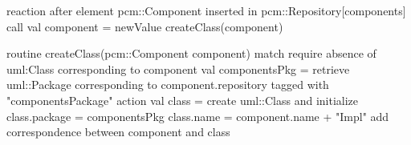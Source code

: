 reaction {
   after element pcm::Component inserted in pcm::Repository[components]
   call {
      val component = newValue
      createClass(component)
   }
}

routine createClass(pcm::Component component) {
   match {
      require absence of uml:Class
         corresponding to component
      val componentsPkg = retrieve uml::Package
         corresponding to component.repository
         tagged with "componentsPackage"
   }
   action {
      val class = create uml::Class and initialize {
         class.package = componentsPkg
         class.name = component.name + "Impl"
      }
      add correspondence between component and class
   }
}